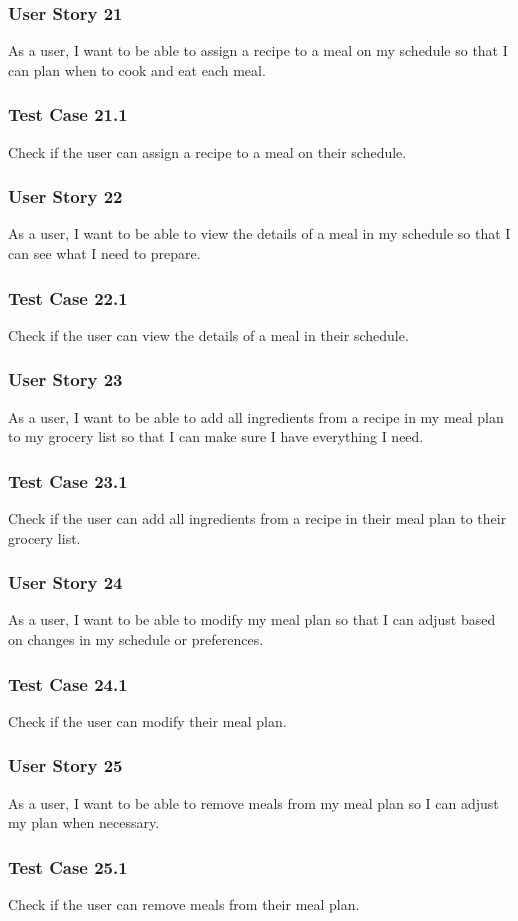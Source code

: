 \documentclass[11pt, letterpaper]{report}
\begin{document}
\subsubsection{User Story 21}
As a user, I want to be able to assign a recipe to a meal on my schedule so that I can plan when to cook and eat each meal.

\subsubsection{Test Case 21.1}
Check if the user can assign a recipe to a meal on their schedule.

\subsubsection{User Story 22}
As a user, I want to be able to view the details of a meal in my schedule so that I can see what I need to prepare.

\subsubsection{Test Case 22.1}
Check if the user can view the details of a meal in their schedule.

\subsubsection{User Story 23}
As a user, I want to be able to add all ingredients from a recipe in my meal plan to my grocery list so that I can make sure I have everything I need.

\subsubsection{Test Case 23.1}
Check if the user can add all ingredients from a recipe in their meal plan to their grocery list.

\subsubsection{User Story 24}
As a user, I want to be able to modify my meal plan so that I can adjust based on changes in my schedule or preferences.

\subsubsection{Test Case 24.1}
Check if the user can modify their meal plan.

\subsubsection{User Story 25}
As a user, I want to be able to remove meals from my meal plan so I can adjust my plan when necessary.

\subsubsection{Test Case 25.1}
Check if the user can remove meals from their meal plan.
\end{document}
